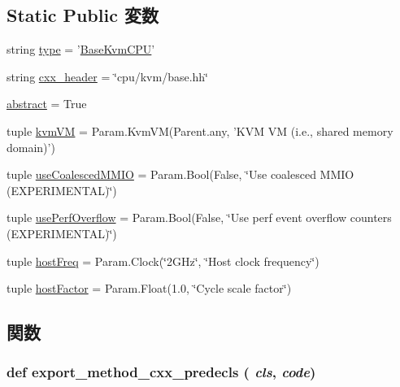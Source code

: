 \subsection*{Static Public 変数}
\begin{DoxyCompactItemize}
\item 
string \hyperlink{classBaseKvmCPU_1_1BaseKvmCPU_acce15679d830831b0bbe8ebc2a60b2ca}{type} = '\hyperlink{classBaseKvmCPU_1_1BaseKvmCPU}{BaseKvmCPU}'
\item 
string \hyperlink{classBaseKvmCPU_1_1BaseKvmCPU_a17da7064bc5c518791f0c891eff05fda}{cxx\_\-header} = \char`\"{}cpu/kvm/base.hh\char`\"{}
\item 
\hyperlink{classBaseKvmCPU_1_1BaseKvmCPU_a17fa61ac3806b481cafee5593b55e5d0}{abstract} = True
\item 
tuple \hyperlink{classBaseKvmCPU_1_1BaseKvmCPU_a46b4643d842fbe4d40dd7450654121e5}{kvmVM} = Param.KvmVM(Parent.any, 'KVM VM (i.e., shared memory domain)')
\item 
tuple \hyperlink{classBaseKvmCPU_1_1BaseKvmCPU_a2196241e0709eb29276d6d7f0ea1a8d4}{useCoalescedMMIO} = Param.Bool(False, \char`\"{}Use coalesced MMIO (EXPERIMENTAL)\char`\"{})
\item 
tuple \hyperlink{classBaseKvmCPU_1_1BaseKvmCPU_ad8233e9873fcc4d5483e71effbceaf2e}{usePerfOverflow} = Param.Bool(False, \char`\"{}Use perf event overflow counters (EXPERIMENTAL)\char`\"{})
\item 
tuple \hyperlink{classBaseKvmCPU_1_1BaseKvmCPU_a0056ec65331f3739ec47a849738aeebe}{hostFreq} = Param.Clock(\char`\"{}2GHz\char`\"{}, \char`\"{}Host clock frequency\char`\"{})
\item 
tuple \hyperlink{classBaseKvmCPU_1_1BaseKvmCPU_a8c73f4ae67c9de430bfe72e25c2426d9}{hostFactor} = Param.Float(1.0, \char`\"{}Cycle scale factor\char`\"{})
\end{DoxyCompactItemize}


\subsection{関数}
\hypertarget{classBaseKvmCPU_1_1BaseKvmCPU_a4c94af862ca1bc3ebde2094d5e778ef1}{
\subsubsection[{export\_\-method\_\-cxx\_\-predecls}]{\setlength{\rightskip}{0pt plus 5cm}def export\_\-method\_\-cxx\_\-predecls ( {\em cls}, \/   {\em code})}}
\label{classBaseKvmCPU_1_1BaseKvmCPU_a4c94af862ca1bc3ebde2094d5e778ef1}



